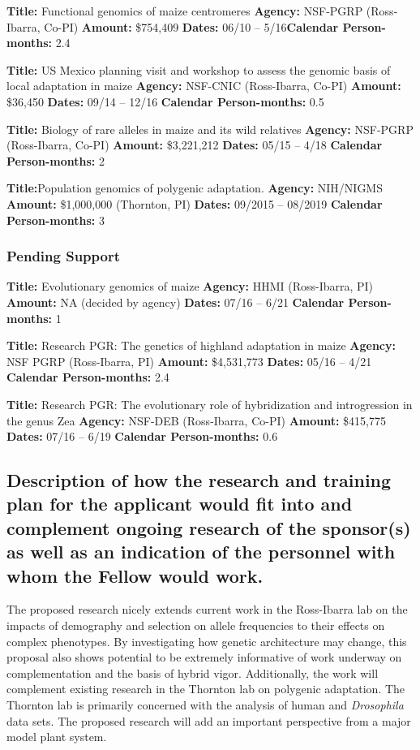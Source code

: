 \noindent\textbf{Title:} Functional genomics of maize centromeres 
\textbf{Agency:} NSF-PGRP (Ross-Ibarra, Co-PI)
\textbf{Amount:} \$754,409
\textbf{Dates:} 06/10 -- 5/16\textbf{Calendar Person-months:} 2.4

\noindent\textbf{Title:} US Mexico planning visit and workshop to assess the genomic basis of local adaptation in maize 
\textbf{Agency:} NSF-CNIC (Ross-Ibarra, Co-PI) 
\textbf{Amount:} \$36,450
\textbf{Dates:} 09/14 -- 12/16
\textbf{Calendar Person-months:} 0.5

\noindent\textbf{Title:} Biology of rare alleles in maize and its wild relatives 
\textbf{Agency:} NSF-PGRP (Ross-Ibarra, Co-PI)
\textbf{Amount:} \$3,221,212
\textbf{Dates:} 05/15 -- 4/18
\textbf{Calendar Person-months:} 2

\noindent\textbf{Title:}Population genomics of polygenic adaptation. 
\textbf{Agency:} NIH/NIGMS 
\textbf{Amount:} \$1,000,000 (Thornton, PI)
\textbf{Dates:} 09/2015 -- 08/2019
\textbf{Calendar Person-months:} 3

\subsubsection*{Pending Support}

\noindent\textbf{Title:} Evolutionary genomics of maize 
\textbf{Agency:} HHMI (Ross-Ibarra, PI)
\textbf{Amount:} NA (decided by agency)
\textbf{Dates:} 07/16 -- 6/21
\textbf{Calendar Person-months:} 1

\noindent\textbf{Title:} Research PGR: The genetics of highland adaptation in maize
\textbf{Agency:} NSF PGRP (Ross-Ibarra, PI)
\textbf{Amount:} \$4,531,773
\textbf{Dates:} 05/16 -- 4/21
\textbf{Calendar Person-months:} 2.4

\noindent\textbf{Title:} Research PGR: The evolutionary role of hybridization and introgression in the genus Zea
\textbf{Agency:} NSF-DEB (Ross-Ibarra, Co-PI)
\textbf{Amount:} \$415,775
\textbf{Dates:} 07/16 -- 6/19
\textbf{Calendar Person-months:} 0.6

\subsection{Description of how the research and training plan for the applicant would fit into and complement ongoing research of the sponsor(s) as well as an indication of the personnel with whom the Fellow would work.}

The proposed research nicely extends current work in the Ross-Ibarra lab on the impacts of demography and selection on allele frequencies to their effects on complex phenotypes. By investigating how genetic architecture may change, this proposal also shows potential to be extremely informative of work underway on complementation and the basis of hybrid vigor.  Additionally, the work will complement existing research in the Thornton lab on polygenic adaptation.  The Thornton lab is primarily concerned with the analysis of human and \textit{Drosophila} data sets.  The proposed research will add an important perspective from a major model plant system.

